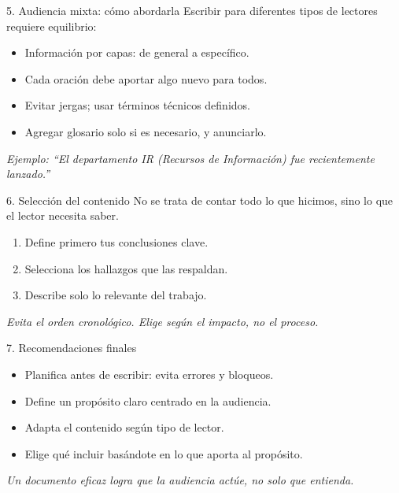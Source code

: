 \documentclass{beamer}
\begin{document}
\begin{frame}{5. Audiencia mixta: cómo abordarla}
Escribir para diferentes tipos de lectores requiere equilibrio:
\begin{itemize}
    \item Información por capas: de general a específico.
    \item Cada oración debe aportar algo nuevo para todos.
    \item Evitar jergas; usar términos técnicos definidos.
    \item Agregar glosario solo si es necesario, y anunciarlo.
\end{itemize}
\textit{Ejemplo: “El departamento IR (Recursos de Información) fue recientemente lanzado.”}
\end{frame}
\begin{frame}{6. Selección del contenido}
No se trata de contar todo lo que hicimos, sino lo que el lector necesita saber.
\begin{enumerate}
    \item Define primero tus conclusiones clave.
    \item Selecciona los hallazgos que las respaldan.
    \item Describe solo lo relevante del trabajo.
\end{enumerate}
\textit{Evita el orden cronológico. Elige según el impacto, no el proceso.}
\end{frame}
\begin{frame}{7. Recomendaciones finales}
\begin{itemize}
    \item Planifica antes de escribir: evita errores y bloqueos.
    \item Define un propósito claro centrado en la audiencia.
    \item Adapta el contenido según tipo de lector.
    \item Elige qué incluir basándote en lo que aporta al propósito.
\end{itemize}
\textit{Un documento eficaz logra que la audiencia actúe, no solo que entienda.}
\end{frame}
\end{document}
